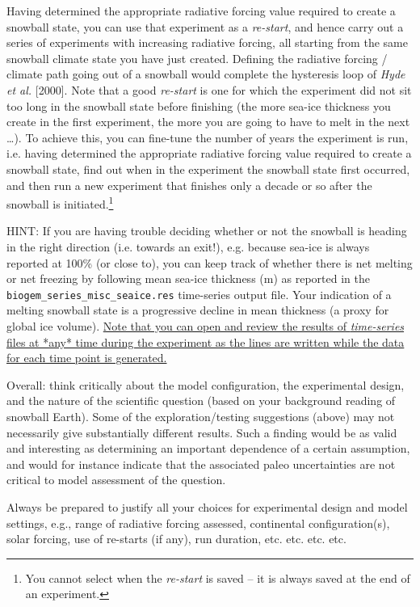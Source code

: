 \documentclass[11pt,fleqn]{book} %
\begin{document}
Having determined the appropriate radiative forcing value required to create a snowball state, you can use that experiment as a \textit{re-start}, and hence carry out a series of experiments with increasing radiative forcing, all starting from the same snowball climate state you have just created. Defining the radiative forcing / climate path going out of a snowball would complete the hysteresis loop of \textit{Hyde et al.} [2000]. Note that a good \textit{re-start} is one for which the experiment did not sit too long in the snowball state before finishing (the more sea-ice thickness you create in the first experiment, the more you are going to have to melt in the next …). To achieve this, you can fine-tune the number of years the experiment is run, i.e. having determined the appropriate radiative forcing value required to create a snowball state, find out when in the experiment the snowball state first occurred, and then run a new experiment that finishes only a decade or so after the snowball is initiated.\footnote{You cannot select when the \textit{re-start} is saved – it is always saved at the end of an experiment.}

HINT: If you are having trouble deciding whether or not the snowball is heading in the right direction (i.e. towards an exit!), e.g. because sea-ice is always reported at 100\% (or close to), you can keep track of whether there is net melting or net freezing by following mean sea-ice thickness (m) as reported in the \texttt{biogem\_series\_misc\_seaice.res} time-series output file. Your indication of a melting snowball state is a progressive decline in mean thickness (a proxy for global ice volume). \uline{Note that you can open and review the results of \textit{time-series} files at *any* time during the experiment as the lines are written while the data for each time point is generated.}

Overall: think critically about the model configuration, the experimental design, and the nature of the scientific question (based on your background reading of snowball Earth). Some of the exploration/testing suggestions (above) may not necessarily give substantially different results. Such a finding would be as valid and interesting as determining an important dependence of a certain assumption, and would for instance indicate that the associated paleo uncertainties are not critical to model assessment of the question.

Always be prepared to justify all your choices for experimental design and model settings, e.g., range of radiative forcing assessed, continental configuration(s), solar forcing, use of re-starts (if any), run duration, etc. etc. etc. etc.
\end{document}
